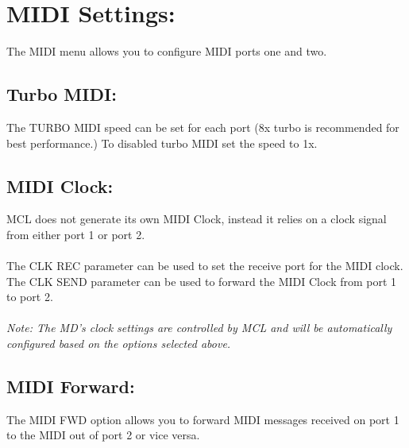 \chapter{MIDI Settings:}
The MIDI menu allows you to configure MIDI ports one and two.\\
\section{Turbo MIDI:}
The TURBO MIDI speed can be set for each port (8x turbo is recommended for best performance.) To disabled turbo MIDI set the speed to 1x.
\section{MIDI Clock:}
MCL does not generate its own MIDI Clock, instead it relies on a clock signal from either port 1 or port 2.\\\\
The CLK REC parameter can be used to set the receive port for the MIDI clock.\\
The CLK SEND parameter can be used to forward the MIDI Clock from port 1 to port 2.\\\\
\textit{Note: The MD's clock settings are controlled by MCL and will be automatically configured based on the options selected above.}

\section{MIDI Forward:}
The MIDI FWD option allows you to forward MIDI messages received on port 1 to the MIDI out of port 2 or vice versa.
